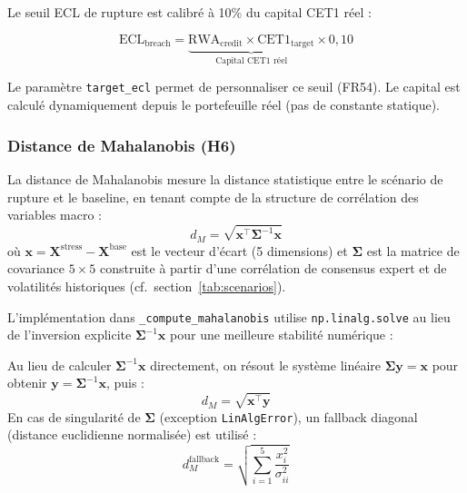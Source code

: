 \documentclass[12pt,a4paper]{article}
\begin{document}
Le seuil ECL de rupture est calibr\'e \`a 10\% du capital CET1 r\'eel :

\begin{equation}
    \text{ECL}_{\text{breach}} = \underbrace{\text{RWA}_{\text{credit}} \times \text{CET1}_{\text{target}}}_{\text{Capital CET1 r\'eel}} \times 0{,}10
    \label{eq:breach}
\end{equation}

Le param\`etre \texttt{target\_ecl} permet de personnaliser ce seuil (FR54).
Le capital est calcul\'e dynamiquement depuis le portefeuille r\'eel
(pas de constante statique).

\subsubsection{Distance de Mahalanobis (H6)}

\begin{definitionbox}
La distance de Mahalanobis mesure la distance statistique entre le sc\'enario
de rupture et le baseline, en tenant compte de la structure de corr\'elation
des variables macro :
\begin{equation}
    d_M = \sqrt{\mathbf{x}^\top \boldsymbol{\Sigma}^{-1} \mathbf{x}}
    \label{eq:mahalanobis}
\end{equation}
o\`u $\mathbf{x} = \mathbf{X}^{\text{stress}} - \mathbf{X}^{\text{base}}$
est le vecteur d'\'ecart (5 dimensions) et $\boldsymbol{\Sigma}$ est la matrice
de covariance $5 \times 5$ construite \`a partir d'une corr\'elation de consensus expert
et de volatilit\'es historiques (cf.\ section~\ref{tab:scenarios}).
\end{definitionbox}

L'impl\'ementation dans \texttt{\_compute\_mahalanobis} utilise
\texttt{np.linalg.solve} au lieu de l'inversion explicite
$\boldsymbol{\Sigma}^{-1} \mathbf{x}$ pour une meilleure stabilit\'e num\'erique :

\begin{formulebox}
Au lieu de calculer $\boldsymbol{\Sigma}^{-1} \mathbf{x}$ directement, on r\'esout
le syst\`eme lin\'eaire $\boldsymbol{\Sigma} \mathbf{y} = \mathbf{x}$ pour obtenir
$\mathbf{y} = \boldsymbol{\Sigma}^{-1} \mathbf{x}$, puis :
\begin{equation}
    d_M = \sqrt{\mathbf{x}^\top \mathbf{y}}
    \label{eq:solve}
\end{equation}
En cas de singularit\'e de $\boldsymbol{\Sigma}$ (exception \texttt{LinAlgError}),
un fallback diagonal (distance euclidienne normalis\'ee) est utilis\'e :
\begin{equation}
    d_M^{\text{fallback}} = \sqrt{\sum_{i=1}^{5} \frac{x_i^2}{\sigma_{ii}^2}}
    \label{eq:fallback}
\end{equation}
\end{formulebox}
\end{document}
